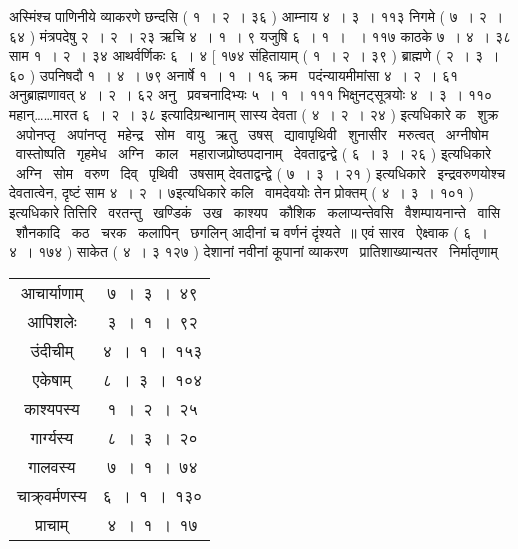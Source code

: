\documentclass[11pt, openany]{book}
\begin{document}
\begin{multicols}{2}
अस्मिंश्च पाणिनीये व्याकरणे छन्दसि ( १~। २~। ३६ ) आम्नाय ४~। ३~। ११३ {\qt निगमे} ( ७~। २~। ६४ ) मंत्रपदेषु २~। २~। २३ {\qt ऋचि ४~। १~। ९ यजुषि ६~। १~। ~। ११७ काठके ७~। ४~। ३८ साम १~। २~। ३४ आथर्वर्णिकः ६~। ४ [ १७४ संहितायाम् ( १~। २~। ३९ ) ब्राह्मणे } ( २~। ३~। ६० ) उपनिषदौ १~। ४~। ७९ अनार्षे १~। १~। १६ क्रम \textendash\ पदंन्यायमीमांसा ४~। २~। ६१ {\qt अनुब्राह्मणावत् ४~। २~। ६२ अनु \textendash\ प्रवचनादिभ्यः ५~। १~। १११ भिक्षुनट्सूत्रयोः ४~। ३~। ११० महान्\ldots\ldots मारत ६~। २~। ३८} इत्यादिग्रन्थानाम् {\qt सास्य देवता} ( ४~। २~। २४ ) इत्यधिकारे क \textendash\ शुक्र \textendash\ अपोनप्तृ \textendash\ अपांनप्तृ \textendash\ महेन्द्र \textendash\ सोम \textendash\ वायु \textendash\ ऋतु \textendash\ उषस् \textendash\ द्यावापृथिवी \textendash\ शुनासीर \textendash\ मरुत्वत् \textendash\ अग्नीषोम \textendash\ वास्तोष्पति \textendash\ गृहमेध \textendash\ अग्नि \textendash\ काल \textendash\ महाराजप्रोष्ठपदानाम् \textendash\ {\qt देवताद्वन्द्वे ( ६~। ३~। २६ ) } इ्त्यधिकारे \textendash\ अग्नि \textendash\ सोम \textendash\ वरुण \textendash\ दिव् \textendash\ पृथिवी \textendash\ उषसाम् {\qt देवताद्वन्द्वे ( ७~। ३~। २१ ) } इत्यधिकारे \textendash\ इन्द्रवरुणयोश्च देवतात्वेन, दृष्टं साम ४~। २~। ७{\qt इत्यधिकारे कलि \textendash\ वामदेवयोः तेन प्रोक्तम् ( ४~। ३~। १०१ ) } इत्यधिकारे तित्तिरि \textendash\ वरतन्तु \textendash\ खण्डिकं \textendash\ उख \textendash\ काश्यप \textendash\ कौशिक \textendash\ कलाप्यन्तेवसि \textendash\ वैशम्पायनान्ते \textendash\ वासि \textendash\ शौनकादि \textendash\ कठ \textendash\ चरक \textendash\ कलापिन् \textendash\ छगलिन् आदीनां च वर्णनं दृंश्यते~॥ एवं {\qt सारव \textendash\ ऐक्ष्वाक ( ६~। ४~। १७४ ) साकेत ( ४~। ३ १२७ ) } देशानां नवीनां कूपानां व्याकरण \textendash\ प्रातिशाख्यान्यतर \textendash\ निर्मातृणाम् \textendash\

\begin{center}
\begin{tabular}{c c}
आचार्याणाम् & ७~।~३~।~४९\\
आपिशलेः & ३~।~१~।~९२\\
उंदीचीम् & ४~।~१~।~१५३\\
एकेषाम् & ८~।~३~।~१०४\\
काश्यपस्य & १~।~२~।~२५\\
गार्ग्यस्य & ८~।~३~।~२०\\
गालवस्य & ७~।~१~।~७४\\
चाक्र्वर्मणस्य & ६~।~१~।~१३०\\
प्राचाम् & ४~।~१~।~१७
\end{tabular}
\end{center}


\end{multicols}
\end{document}
